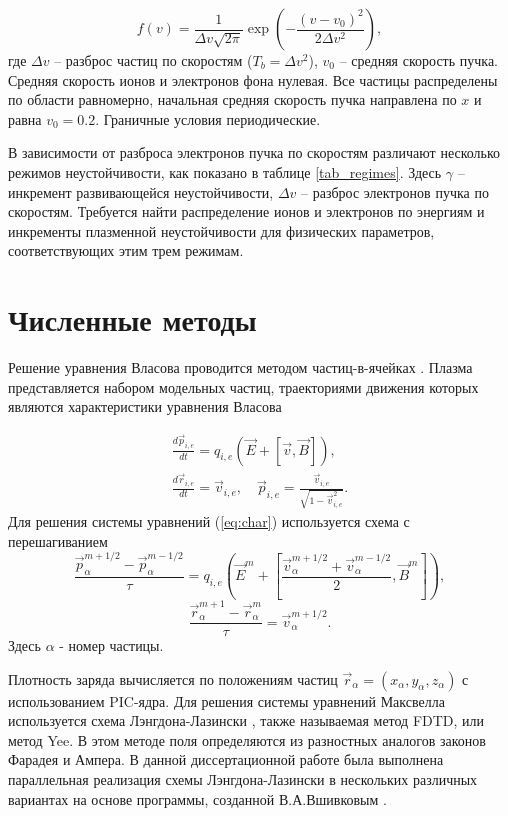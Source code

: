 $$
f(v)=\frac{1}{\Delta v \sqrt{2
		\pi}}\exp \left( {-\frac{(v-v_0)^2}{2 \Delta v^2}}\right) ,
$$
где $\Delta v$ -- разброс частиц по скоростям ($T_b=\Delta v^2$), $v_0$ -- средняя
скорость пучка. Средняя скорость ионов и электронов фона нулевая. Все частицы распределены по области равномерно, начальная средняя скорость пучка направлена по $x$ и равна $v_0=0.2$. Граничные условия периодические. 





В зависимости от разброса электронов пучка по скоростям различают несколько режимов неустойчивости, как показано в таблице \ref{tab_regimes}. Здесь $\gamma$ --  инкремент развивающейся неустойчивости, $\Delta v $ -- разброс электронов пучка по скоростям. Требуется найти распределение ионов и электронов по энергиям и инкременты плазменной неустойчивости для физических параметров, соответствующих этим трем режимам.



\section{Численные методы}


Решение уравнения Власова проводится методом
частиц-в-ячейках \cite{VshivkovPICbook}. Плазма представляется набором модельных частиц, траекториями движения которых являются характеристики урав\-не\-ния Власова

\begin{eqnarray}\label{eq:char}
\frac{d \vec{p} _{i,e}}{d t}=q_{i,e}(\vec{E}+[\vec{v},\vec{B}]),
\\
\frac{d \vec{r} _{i,e}}{d t}=\vec{v}_{i,e}, \quad \vec{p}_{i,e}=\frac{\vec{v}_{i,e}}{\sqrt{1-\vec{v}_{i,e}^2}}.\nonumber
\end{eqnarray}
Для решения системы уравнений (\ref{eq:char}) используется схема с перешагиванием 
$$
\frac{\vec{p}^{m+1/2}_\alpha-\vec{p}^{m-1/2}_\alpha}{\tau}=q_{i,e}\left({\vec{E}}^m+\left[\frac{{\vec{v}}^{m+1/2}_\alpha+{\vec{v}}^{m-1/2}_\alpha}{2},{\vec{B}}^m \right] \right),
$$
$$
\frac{{\vec{r}}_\alpha^{m+1}-{\vec{r}}_\alpha^{m}}{\tau}={\vec{v}}^{m+1/2}_\alpha.
$$
Здесь $\alpha$ - номер частицы.

Плотность заряда вычисляется по положениям частиц ${\vec{r}}_\alpha=(x_\alpha,y_\alpha,z_\alpha)$ с использованием PIC-ядра.
Для решения системы уравнений Максвелла используется схема Лэнгдона-Лазински \cite{lasin}, также называемая метод FDTD, или метод Yee\cite{Yee}. В этом методе поля определяются из разностных аналогов законов Фарадея и Ампера. В данной диссертационной работе была выполнена параллельная реализация схемы Лэнгдона-Лазински в нескольких различных вариантах  на основе программы, созданной В.А.Вшивковым \cite{laser}.

